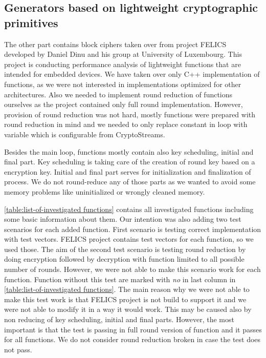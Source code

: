 \documentclass[
    digital,    %
    oneside,    %
    color,
    11pt,
    nocover,
    notable,
    nolof,
    nolot,
    final
]{fithesis3}
\begin{document}
\subsection{Generators based on lightweight cryptographic primitives}
\label{sec:added_lightweight_crypto}

The other part contains block ciphers taken over from project FELICS~\cite{dinu2015felics} developed by Daniel Dinu and his group at University of Luxembourg. This project is conducting performance analysis of lightweight functions that are intended for embedded devices. We have taken over only C++ implementation of functions, as we were not interested in implementations optimized for other architectures. Also we needed to implement round reduction of functions ourselves as the project contained only full round implementation. However, provision of round reduction was not hard, mostly functions were prepared with round reduction in mind and we needed to only replace constant in loop with variable which is configurable from CryptoStreams. 

Besides the main loop, functions mostly contain also key scheduling, initial and final part. Key scheduling is taking care of the creation of round key based on a encryption key. Initial and final part serves for initialization and finalization of process. We do not round-reduce any of those parts as we wanted to avoid some memory problems like uninitialized or wrongly cleaned memory.

\cref{table:list-of-investigated functions} contains all investigated functions including some basic information about them. Our intention was also adding two test scenarios for each added function. First scenario is testing correct implementation with test vectors. FELICS project contains test vectors for each function, so we used those. The aim of the second test scenario is testing round reduction by doing encryption followed by decryption with function limited to all possible number of rounds. However, we were not able to make this scenario work for each function. Function without this test are marked with \textit{no} in last column in \cref{table:list-of-investigated functions}. The main reason why we were not able to make this test work is that FELICS project is not build to support it and we were not able to modify it in a way it would work. This may be caused also by non reducing of key scheduling, initial and final parts. However, the most important is that the test is passing in full round version of function and it passes for all functions. We do not consider round reduction broken in case the test does not pass. 
\end{document}

